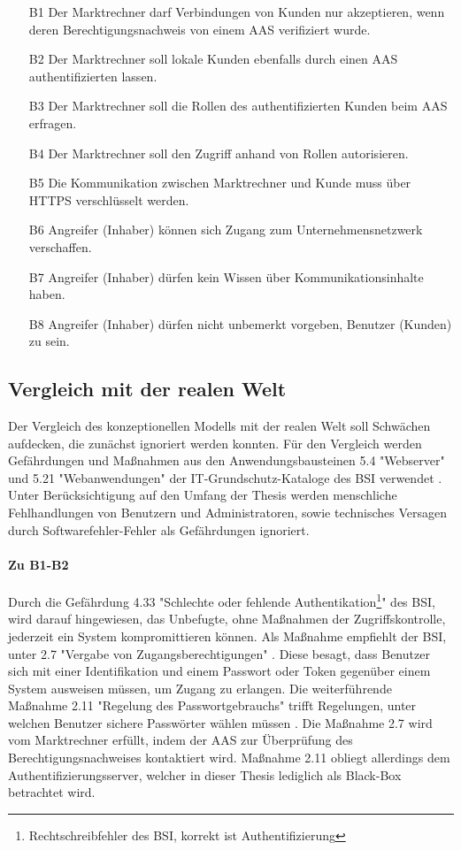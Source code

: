 \documentclass[11pt,a4paper]{report}
\begin{document}
\begin{enumerate}[leftmargin=*]
\item[B1] Der Marktrechner darf Verbindungen von Kunden nur akzeptieren, wenn deren Berechtigungsnachweis von einem AAS verifiziert wurde.
\item[B2] Der Marktrechner soll lokale Kunden ebenfalls durch einen AAS authentifizierten lassen.
\item[B3] Der Marktrechner soll die Rollen des authentifizierten Kunden beim AAS erfragen.
\item[B4] Der Marktrechner soll den Zugriff anhand von Rollen autorisieren.
\item[B5] Die Kommunikation zwischen Marktrechner und Kunde muss über HTTPS verschlüsselt werden.
\item[B6] Angreifer (Inhaber) können sich Zugang zum Unternehmensnetzwerk verschaffen.
\item[B7] Angreifer (Inhaber) dürfen kein Wissen über Kommunikationsinhalte haben.
\item[B8] Angreifer (Inhaber) dürfen nicht unbemerkt vorgeben, Benutzer (Kunden) zu sein.
\end{enumerate}

\subsection{Vergleich mit der realen Welt}

Der Vergleich des konzeptionellen Modells mit der realen Welt soll Schwächen aufdecken, die zunächst ignoriert werden konnten. Für den Vergleich werden Gefährdungen und Maßnahmen aus den Anwendungsbausteinen 5.4 "Webserver" und 5.21 "Webanwendungen" der IT-Grundschutz-Kataloge des BSI verwendet \cite{bsi_b5004, bsi_b5021}. Unter Berücksichtigung auf den Umfang der Thesis werden menschliche Fehlhandlungen von Benutzern und Administratoren, sowie technisches Versagen durch Softwarefehler-Fehler als Gefährdungen ignoriert.

\paragraph{Zu B1-B2} Durch die Gefährdung 4.33 "Schlechte oder fehlende Authentikation\footnote{Rechtschreibfehler des BSI, korrekt ist Authentifizierung}" \cite{bsi_g4033} des BSI, wird darauf hingewiesen, das Unbefugte, ohne Maßnahmen der Zugriffskontrolle, jederzeit ein System kompromittieren können. Als Maßnahme empfiehlt der BSI, unter 2.7 "Vergabe von Zugangsberechtigungen" \cite{bsi_m2007}. Diese besagt, dass Benutzer sich mit einer Identifikation und einem Passwort oder Token gegenüber einem System ausweisen müssen, um Zugang zu erlangen. Die weiterführende Maßnahme 2.11 "Regelung des Passwortgebrauchs" trifft Regelungen, unter welchen Benutzer sichere Passwörter wählen müssen \cite{bsi_m2011}. Die Maßnahme 2.7 wird vom Marktrechner erfüllt, indem der AAS zur Überprüfung des Berechtigungsnachweises kontaktiert wird. Maßnahme 2.11 obliegt allerdings dem Authentifizierungsserver, welcher in dieser Thesis lediglich als Black-Box betrachtet wird.
\end{document}
